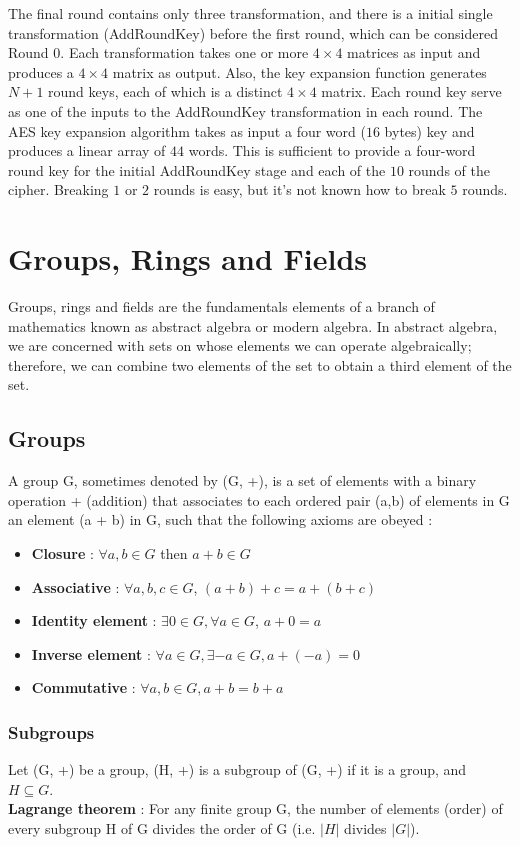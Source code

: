 \documentclass[11pt]{article}
\begin{document}
The final round contains only three transformation, and there is a initial single transformation (AddRoundKey) before the first round, which can be considered Round $0$. Each transformation takes one or more $4 \times 4$ matrices as input and produces a $4 \times 4$ matrix as output. Also, the key expansion function generates $N + 1$ round keys, each of which is a distinct $4 \times 4$ matrix. Each round key serve as one of the inputs to the AddRoundKey transformation in each round. The AES key expansion algorithm takes as input a four word ($16$ bytes) key and produces a linear array of $44$ words. This is sufficient to provide a four-word round key for the initial AddRoundKey stage and each of the $10$ rounds of the cipher. Breaking $1$ or $2$ rounds is easy, but it's not known how to break $5$ rounds.
\section{Groups, Rings and Fields}
Groups, rings and fields are the fundamentals elements of a branch of mathematics known as abstract algebra or modern algebra. In abstract algebra, we are concerned with sets on whose elements we can operate algebraically; therefore, we can combine two elements of the set to obtain a third element of the set.
\subsection{Groups}
A group G, sometimes denoted by (G, +), is a set of elements with a binary operation + (addition) that associates to each ordered pair (a,b) of elements in G an element (a + b) in G, such that the following axioms are obeyed : 
\begin{itemize}
\item \textbf{Closure} : $\forall a,b \in G$ then $a + b \in G$
\item \textbf{Associative} : $\forall a,b,c \in G$, $(a + b) + c = a + (b + c) $
\item \textbf{Identity element} : $\exists 0 \in G, \forall a \in G$, $a + 0 = a$
\item \textbf{Inverse element} : $\forall a \in G, \exists -a \in G, a + (-a) = 0$
\item \textbf{Commutative} : $\forall a,b \in G, a + b = b + a$
\end{itemize}
\subsubsection{Subgroups}
Let (G, +) be a group, (H, +) is a subgroup of (G, +) if it is a group, and $H \subseteq G$.\\\textbf{Lagrange theorem} : For any finite group G, the number of elements (order) of every subgroup H of G divides the order of G (i.e. $|H|$ divides $|G|$).
\end{document}
